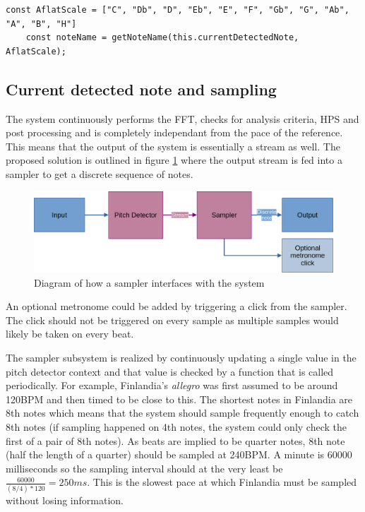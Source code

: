 \begin{lstlisting}[style=javascript]
    const AflatScale = ["C", "Db", "D", "Eb", "E", "F", "Gb", "G", "Ab", "A", "B", "H"]
    const noteName = getNoteName(this.currentDetectedNote, AflatScale);
\end{lstlisting}

\subsection{Current detected note and sampling}
The system continuously performs the FFT, checks for analysis criteria, HPS and post processing and is completely independant from the pace of the reference. This means that the output of the system is essentially a stream as well. The proposed solution is outlined in figure \ref{fig:samplerArch} where the output stream is fed into a sampler to get a discrete sequence of notes. 

\begin{figure}[ht]
    \centering
    \includegraphics[width=\textwidth]{./images/samplerArch.png}
    \caption{Diagram of how a sampler interfaces with the system\label{fig:samplerArch}}
\end{figure}

An optional metronome could be added by triggering a click from the sampler. The click should not be triggered on every sample as multiple samples would likely be taken on every beat. 

The sampler subsystem is realized by continuously updating a single value in the pitch detector context and that value is checked by a function that is called periodically. For example, Finlandia's \textit{allegro} was first assumed to be around 120BPM and then timed to be close to this. The shortest notes in Finlandia are 8th notes which means that the system should sample frequently enough to catch 8th notes (if sampling happened on 4th notes, the system could only check the first of a pair of 8th notes). As beats are implied to be quarter notes, 8th note (half the length of a quarter) should be sampled at 240BPM. A minute is 60000 milliseconds so the sampling interval should at the very least be $\frac{60000}{(8/4)*120} = 250ms$. This is the slowest pace at which Finlandia must be sampled without losing information.

